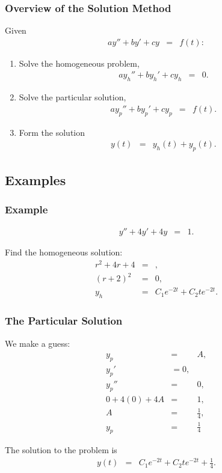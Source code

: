 \begin{frame}
  \frametitle{Overview of the Solution Method}

  Given
  \begin{eqnarray*}
    a y'' + by' + cy & = & f(t):
  \end{eqnarray*}
  \begin{enumerate}
  \item Solve the homogeneous problem,
    \begin{eqnarray*}
      a y_h'' + by_h' + cy_h & = & 0.
    \end{eqnarray*}
  \item Solve the particular solution,
    \begin{eqnarray*}
      a y_p'' + by_p' + cy_p & = & f(t).
    \end{eqnarray*}
  \item Form the solution
    \begin{eqnarray*}
      y(t) & = & y_h(t) + y_p(t).
    \end{eqnarray*}
  \end{enumerate}


\end{frame}

\subsection{Examples}

\begin{frame}
  \frametitle{Example}

  \begin{eqnarray*}
    y'' + 4y' + 4y & = & 1.
  \end{eqnarray*}

  {
    Find the homogeneous solution:
      \begin{eqnarray*}
        r^2 + 4r + 4 & = &, \\
        (r+2)^2 & = & 0, \\
        y_h & = & C_1 e^{-2t} + C_2 t e^{-2t}.
      \end{eqnarray*}
    }

\end{frame}


\begin{frame}
  \frametitle{The Particular Solution}
  
  We make a guess:
  \begin{eqnarray*}
    y_p & = & A, \\
    y_p' & = 0, \\
    y_p'' & = & 0, \\
    0 + 4(0) + 4A & = & 1, \\
    A & = & \frac{1}{4}, \\
    y_p & = & \frac{1}{4}
  \end{eqnarray*}

  The solution to the problem is
  \begin{eqnarray*}
    y(t) & = & C_1 e^{-2t} + C_2 t e^{-2t} + \frac{1}{4}.
  \end{eqnarray*}

\end{frame}

